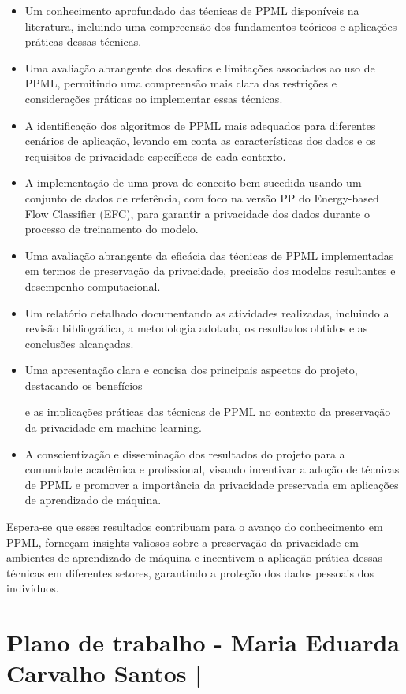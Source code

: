 \documentclass{article}
\begin{document}
\begin{itemize}
\item Um conhecimento aprofundado das técnicas de PPML disponíveis na literatura, incluindo uma compreensão dos fundamentos teóricos e aplicações práticas dessas técnicas.
\item Uma avaliação abrangente dos desafios e limitações associados ao uso de PPML, permitindo uma compreensão mais clara das restrições e considerações práticas ao implementar essas técnicas.
\item A identificação dos algoritmos de PPML mais adequados para diferentes cenários de aplicação, levando em conta as características dos dados e os requisitos de privacidade específicos de cada contexto.
\item A implementação de uma prova de conceito bem-sucedida usando um conjunto de dados de referência, com foco na versão PP do Energy-based Flow Classifier (EFC), para garantir a privacidade dos dados durante o processo de treinamento do modelo.
\item Uma avaliação abrangente da eficácia das técnicas de PPML implementadas em termos de preservação da privacidade, precisão dos modelos resultantes e desempenho computacional.
\item Um relatório detalhado documentando as atividades realizadas, incluindo a revisão bibliográfica, a metodologia adotada, os resultados obtidos e as conclusões alcançadas.
\item Uma apresentação clara e concisa dos principais aspectos do projeto, destacando os benefícios

e as implicações práticas das técnicas de PPML no contexto da preservação da privacidade em machine learning.
\item A conscientização e disseminação dos resultados do projeto para a comunidade acadêmica e profissional, visando incentivar a adoção de técnicas de PPML e promover a importância da privacidade preservada em aplicações de aprendizado de máquina.
\end{itemize}

Espera-se que esses resultados contribuam para o avanço do conhecimento em PPML, forneçam insights valiosos sobre a preservação da privacidade em ambientes de aprendizado de máquina e incentivem a aplicação prática dessas técnicas em diferentes setores, garantindo a proteção dos dados pessoais dos indivíduos.



\section{Plano de trabalho - Maria Eduarda Carvalho Santos | }
\end{document}
